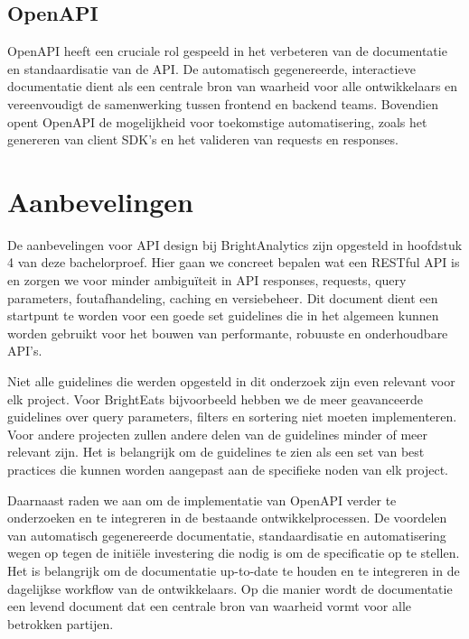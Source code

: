 \subsection{OpenAPI}

OpenAPI heeft een cruciale rol gespeeld in het verbeteren van de documentatie en standaardisatie van de API. De automatisch gegenereerde, interactieve documentatie dient als een centrale bron van waarheid voor alle ontwikkelaars en vereenvoudigt de samenwerking tussen frontend en backend teams. Bovendien opent OpenAPI de mogelijkheid voor toekomstige automatisering, zoals het genereren van client SDK's en het valideren van requests en responses.

\section{Aanbevelingen}

De aanbevelingen voor API design bij BrightAnalytics zijn opgesteld in hoofdstuk 4 van deze bachelorproef. Hier gaan we concreet bepalen wat een RESTful API is en zorgen we voor minder ambigu\"iteit in API responses, requests, query parameters, foutafhandeling, caching en versiebeheer. Dit document dient een startpunt te worden voor een goede set guidelines die in het algemeen kunnen worden gebruikt voor het bouwen van performante, robuuste en onderhoudbare API's.

\bigskip

Niet alle guidelines die werden opgesteld in dit onderzoek zijn even relevant voor elk project. Voor BrightEats bijvoorbeeld hebben we de meer geavanceerde guidelines over query parameters, filters en sortering niet moeten implementeren. Voor andere projecten zullen andere delen van de guidelines minder of meer relevant zijn. Het is belangrijk om de guidelines te zien als een set van best practices die kunnen worden aangepast aan de specifieke noden van elk project.

\bigskip

Daarnaast raden we aan om de implementatie van OpenAPI verder te onderzoeken en te integreren in de bestaande ontwikkelprocessen. De voordelen van automatisch gegenereerde documentatie, standaardisatie en automatisering wegen op tegen de initi\"ele investering die nodig is om de specificatie op te stellen. Het is belangrijk om de documentatie up-to-date te houden en te integreren in de dagelijkse workflow van de ontwikkelaars. Op die manier wordt de documentatie een levend document dat een centrale bron van waarheid vormt voor alle betrokken partijen.

